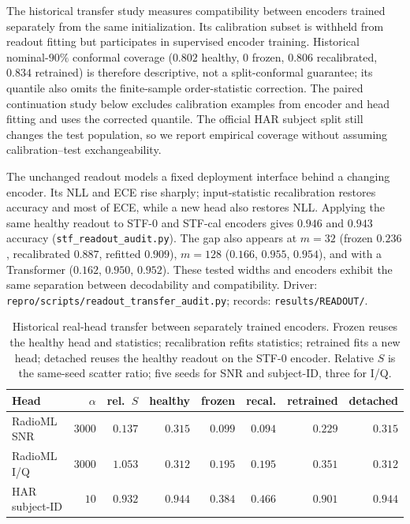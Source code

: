 \documentclass{article}
\begin{document}
The historical transfer study measures compatibility between encoders trained separately from the same initialization. Its calibration subset is withheld from readout fitting but participates in supervised encoder training. Historical nominal-$90\%$ conformal coverage ($0.802$ healthy, $0$ frozen, $0.806$ recalibrated, $0.834$ retrained) is therefore descriptive, not a split-conformal guarantee; its quantile also omits the finite-sample order-statistic correction. The paired continuation study below excludes calibration examples from encoder and head fitting and uses the corrected quantile. The official HAR subject split still changes the test population, so we report empirical coverage without assuming calibration--test exchangeability.

The unchanged readout models a fixed deployment interface behind a changing encoder. Its NLL and ECE rise sharply; input-statistic recalibration restores accuracy and most of ECE, while a new head also restores NLL. Applying the same healthy readout to STF-0 and STF-cal encoders gives $0.946$ and $0.943$ accuracy (\texttt{stf\_readout\_audit.py}). The gap also appears at $m=32$ (frozen $0.236$, recalibrated $0.887$, refitted $0.909$), $m=128$ ($0.166$, $0.955$, $0.954$), and with a Transformer ($0.162$, $0.950$, $0.952$). These tested widths and encoders exhibit the same separation between decodability and compatibility. Driver: \texttt{repro/scripts/readout\_transfer\_audit.py}; records: \texttt{results/READOUT/}.

\begin{table}[t]
\centering
\caption{Historical real-head transfer between separately trained encoders. Frozen reuses the healthy head and statistics; recalibration refits statistics; retrained fits a new head; detached reuses the healthy readout on the STF-0 encoder. Relative $S$ is the same-seed scatter ratio; five seeds for SNR and subject-ID, three for I/Q.}
\label{tab:real_head}
\footnotesize
\begin{tabular}{lrrrrrrr}
\toprule
Head & $\alpha$ & rel.\ $S$ & healthy & frozen & recal. & retrained & detached \\
\midrule
RadioML SNR & $3000$ & $0.137$ & $0.315$ & $0.099$ & $0.094$ & $0.229$ & $0.315$ \\
RadioML I/Q & $3000$ & $1.053$ & $0.312$ & $0.195$ & $0.195$ & $0.351$ & $0.312$ \\
HAR subject-ID & $10$ & $0.932$ & $0.944$ & $0.384$ & $0.466$ & $0.901$ & $0.944$ \\
\bottomrule
\end{tabular}
\end{table}
\end{document}
